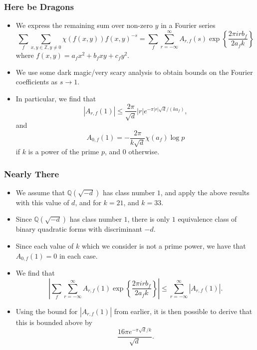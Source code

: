 \documentclass[handout]{beamer}
\begin{document}
\begin{frame}
	
	\frametitle{Here be Dragons}

	\begin{itemize}

		\item We express the remaining sum over non-zero $y$ in a Fourier series
			\[
				\sum_{f} \sum_{x, y \in \mathbb{Z}, y \neq 0} \chi (f(x, y)) {f(x, y)}^{-s} = \sum_{f} \sum_{r = -\infty}^{\infty} A_{r, f}(s) \exp\left\{\frac{2 \pi i r b_f}{2 a_f k} \right\}
			\]
			where $f(x, y) = a_f x^2 + b_f xy + c_f y^2$. \pause

		\item We use some dark magic/very scary analysis to obtain bounds on the Fourier coefficients as $s \to 1$. \pause

		\item In particular, we find that
			\[
				|A_{r, f}(1)| \leq \frac{2 \pi}{\sqrt{d}} |r| e^{-\pi |r| \sqrt{d} / (k a_f)},
			\]
			and
			\[
				A_{0, f}(1) = - \frac{2 \pi}{k \sqrt{d}} \chi(a_f) \log p
			\]
			if $k$ is a power of the prime $p$, and $0$ otherwise.

	\end{itemize}

\end{frame}

\begin{frame}

	\frametitle{Nearly There}

	\begin{itemize}
		
		\item We assume that $\mathbb{Q}(\sqrt{-d})$ has class number $1$, and apply the above results with this value of $d$, and for $k = 21$, and $k = 33$. \pause

		\item Since $\mathbb{Q}(\sqrt{-d})$ has class number $1$, there is only $1$ equivalence class of binary quadratic forms with discriminant $-d$. \pause

		\item Since each value of $k$ which we consider is not a prime power, we have that $A_{0, f}(1) = 0$ in each case. \pause

		\item We find that
			\[
			\left| \sum_{f} \sum_{r = -\infty}^{\infty} A_{r, f}(1) \exp\left\{\frac{2 \pi i r b_f}{2 a_f k} \right\} \right| \leq \sum_{r = -\infty}^{\infty} |A_{r, f}(1)|.
			\]
			\pause

		\item Using the bound for $|A_{r, f}(1)|$ from earlier, it is then possible to derive that this is bounded above by
			\[
				\frac{16 \pi e^{- \pi \sqrt{d} / k}}{\sqrt{d}}.
			\]
			\pause

	\end{itemize}

\end{frame}
\end{document}
